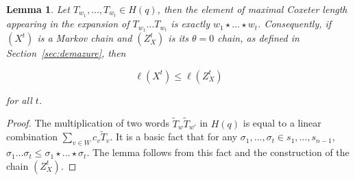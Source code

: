 \documentclass[11pt]{article}
\theoremstyle{plain}  %
\newtheorem{corollary}[theorem]{Corollary}
\newtheorem{lemma}[theorem]{Lemma}
\begin{document}
\begin{lemma}\label{lem:coupling}
Let $T_{w_1},\ldots,T_{w_t} \in H(q)$, then the element of maximal Coxeter length appearing in the expansion of $T_{w_1}\ldots T_{w_t}$ is exactly $w_1 \star \ldots \star w_t$. Consequently, if $(X^t)$ is a Markov chain and $(Z^t_X)$ is its $\theta=0$ chain, as defined in Section~\ref{sec:demazure}, then

$$
\ell(X^t) \le \ell(Z^t_X)
$$

for all $t$.
\end{lemma}

\begin{proof}
The multiplication of two words $\tilde T_{w} \tilde T_{w'}$ in $H(q)$ is equal to a linear combination $\sum_{v \in W} c_v\tilde T_v$. It is a basic fact that for any $\sigma_1,\ldots,\sigma_t \in {s_1,\ldots,s_{n-1}}$, $\sigma_1\ldots \sigma_t \le \sigma_1 \star \ldots \star \sigma_t$. The lemma follows from this fact and the construction of the chain $(Z^t_X)$.
\end{proof}





\end{document}
